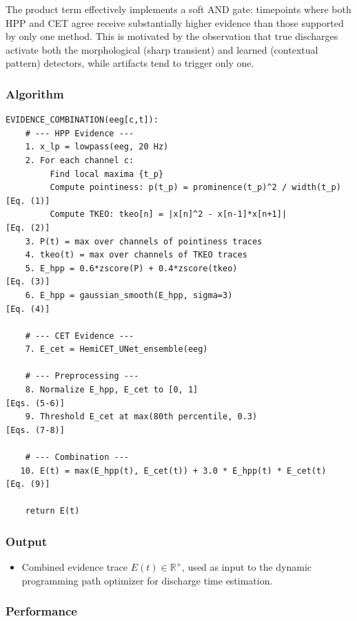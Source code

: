 The product term effectively implements a soft AND gate: timepoints where both HPP and CET agree receive substantially higher evidence than those supported by only one method. This is motivated by the observation that true discharges activate both the morphological (sharp transient) and learned (contextual pattern) detectors, while artifacts tend to trigger only one.

\subsubsection{Algorithm}

\begin{verbatim}
EVIDENCE_COMBINATION(eeg[c,t]):
    # --- HPP Evidence ---
    1. x_lp = lowpass(eeg, 20 Hz)
    2. For each channel c:
         Find local maxima {t_p}
         Compute pointiness: p(t_p) = prominence(t_p)^2 / width(t_p)     [Eq. (1)]
         Compute TKEO: tkeo[n] = |x[n]^2 - x[n-1]*x[n+1]|               [Eq. (2)]
    3. P(t) = max over channels of pointiness traces
    4. tkeo(t) = max over channels of TKEO traces
    5. E_hpp = 0.6*zscore(P) + 0.4*zscore(tkeo)                          [Eq. (3)]
    6. E_hpp = gaussian_smooth(E_hpp, sigma=3)                            [Eq. (4)]

    # --- CET Evidence ---
    7. E_cet = HemiCET_UNet_ensemble(eeg)

    # --- Preprocessing ---
    8. Normalize E_hpp, E_cet to [0, 1]                                [Eqs. (5-6)]
    9. Threshold E_cet at max(80th percentile, 0.3)                    [Eqs. (7-8)]

    # --- Combination ---
   10. E(t) = max(E_hpp(t), E_cet(t)) + 3.0 * E_hpp(t) * E_cet(t)      [Eq. (9)]

    return E(t)
\end{verbatim}

\subsubsection{Output}

\begin{itemize}
  \item Combined evidence trace $E(t) \in \mathbb{R}^+$, used as input to the dynamic programming path optimizer for discharge time estimation.
\end{itemize}

\subsubsection{Performance}

